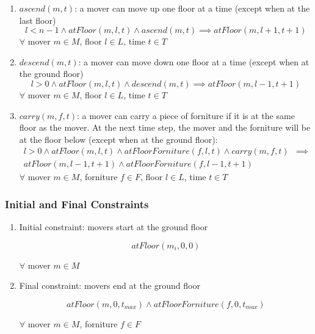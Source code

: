 \documentclass[a4paper, 11pt]{article}
\begin{document}
\begin{enumerate}
    \item $ascend(m, t)$: a mover can move up one floor at a time (except when at the last floor)
    $$
    l < n -1 \land atFloor(m, l, t) \land ascend(m, t) \implies atFloor(m, l+1, t+1) 
    $$ 
    $\forall$ mover $m \in M$, floor $l \in L$, time $t \in T$

    \item $descend(m, t)$: a mover can move down one floor at a time (except when at the ground floor)
    $$
    l > 0 \land atFloor(m, l, t) \land descend(m, t) \implies atFloor(m, l-1, t+1) 
    $$ 
     $\forall$ mover $m \in M$, floor $l \in L$, time $t \in T$

     \item $carry(m, f, t)$: a mover can carry a piece of forniture if it is at the same floor as the mover. At the next time step, the mover and the forniture will be at the floor below (except when at the ground floor):
    \begin{align*}
    l > 0 \land atFloor(m, l, t) \land atFloorForniture(f, l, t) \land carry(m, f , t) & \implies \\
    atFloor(m, l-1, t+1) \land atFloorForniture(f, l-1, t+1)
\end{align*}
     $\forall$ mover $m \in M$, forniture $f \in F$, floor $l \in L$, time $t \in T$
    
\end{enumerate}


\subsubsection{Initial and Final Constraints}

\begin{enumerate}
    \item Initial constraint: movers start at the ground floor

    $$atFloor(m_i, 0, 0)$$

    $\forall$ mover $m \in M$

    \item Final constraint: movers end at the ground floor

    $$atFloor(m, 0, t_{max}) \land atFloorForniture(f, 0, t_{max})$$

     $\forall$ mover $m \in M$, forniture $f \in F$
    

    
\end{enumerate}
\end{document}
